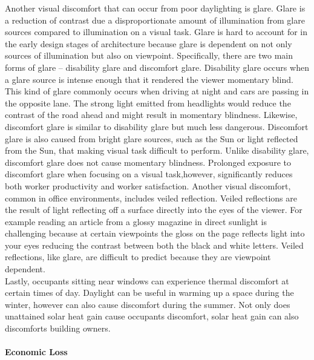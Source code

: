     Another visual discomfort that can occur from poor daylighting is glare.
    Glare is a reduction of contrast due a disproportionate amount of illumination from glare sources compared to illumination on a visual task.
    Glare is hard to account for in the early design stages of architecture because glare is dependent on not only sources of illumination but also on viewpoint.
    Specifically, there are two main forms of glare -- disability glare and discomfort glare.\cite{Robbins}
    Disability glare occurs when a glare source is intense enough that it rendered the viewer momentary blind. 
    This kind of glare commonly occurs when driving at night and cars are passing in the opposite lane. 
    The strong light emitted from headlights would reduce the contrast of the road ahead and might result in momentary blindness.
    Likewise, discomfort glare is similar to disability glare but much less dangerous. 
    Discomfort glare is also caused from bright glare sources, such as the Sun or light reflected from the Sun, that making visual task difficult to perform.
    Unlike disability glare, discomfort glare does not cause momentary blindness.  
    Prolonged exposure to discomfort glare when focusing on a visual task,however, significantly reduces both worker productivity and worker satisfaction\cite{boyce}. 
    Another visual discomfort, common in office environments, includes veiled reflection.
    Veiled reflections are the result of light reflecting off a surface directly into the eyes of the viewer. 
    For example reading an article from a glossy magazine in direct sunlight is challenging because at certain viewpoints the gloss on the page reflects light into your eyes reducing the contrast between both the black and white letters. 
    Veiled reflections, like glare, are difficult to predict because they are viewpoint dependent. \\

    Lastly, occupants sitting near windows can experience thermal discomfort at certain times of day.
    Daylight can be useful in warming up a space during the winter, however can also cause discomfort during the summer.
    Not only does unattained solar heat gain cause occupants discomfort, solar heat gain can also discomforts building owners.

    \paragraph{Economic Loss}
    
